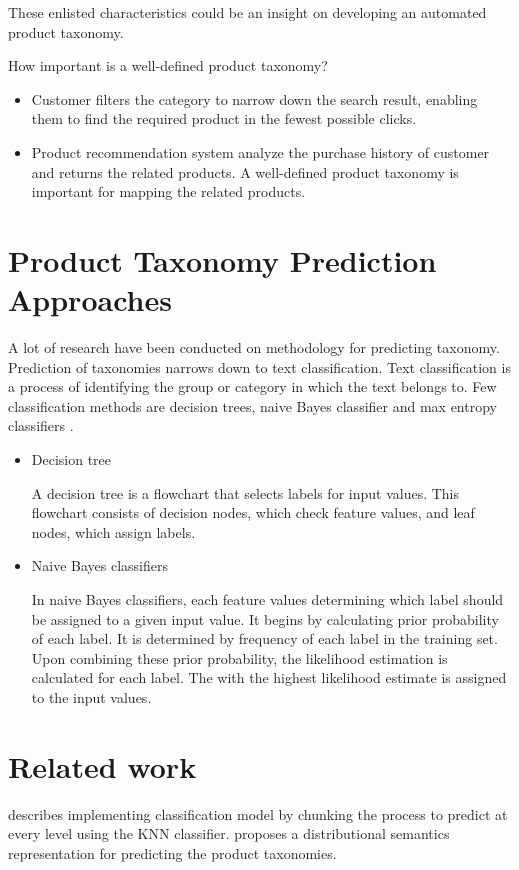 These enlisted characteristics could be an insight on developing an automated product taxonomy.

How important is a well-defined product taxonomy?
\begin{itemize}
    \item Customer filters the category to narrow down the search result, enabling them to find the required product in the fewest possible clicks.
    \item Product recommendation system analyze the purchase history of customer and returns the related products. A well-defined product taxonomy is important for mapping the related products.
\end{itemize}

\section{Product Taxonomy Prediction Approaches}


A lot of research have been conducted on methodology for predicting taxonomy. Prediction of taxonomies narrows down to text classification. Text classification is a process of identifying the group or category in which the  text belongs to.  Few classification methods are decision trees, naive Bayes classifier and max entropy classifiers \parencite{BirdKleinLoper09}. 


\begin{itemize}
    \item Decision  tree
    
    A decision tree is a flowchart that selects labels for input values. This flowchart consists of decision nodes, which check feature values, and leaf nodes, which assign labels. 

    \item Naive Bayes classifiers
    
    In naive Bayes classifiers, each feature values determining which label should be assigned to a given input value. It begins by calculating prior probability of each label. It is determined by frequency of each label in the training set. Upon combining these prior probability, the likelihood estimation is calculated for each label. The with the highest likelihood estimate is assigned to the input values.
\end{itemize}

\section{Related work}

\parencite{AliCevahir.} describes implementing classification model by chunking the process to predict at every level using the \acl*{KNN} classifier. \parencite{Gupta.20062016}  proposes a distributional semantics representation for predicting the product taxonomies.




